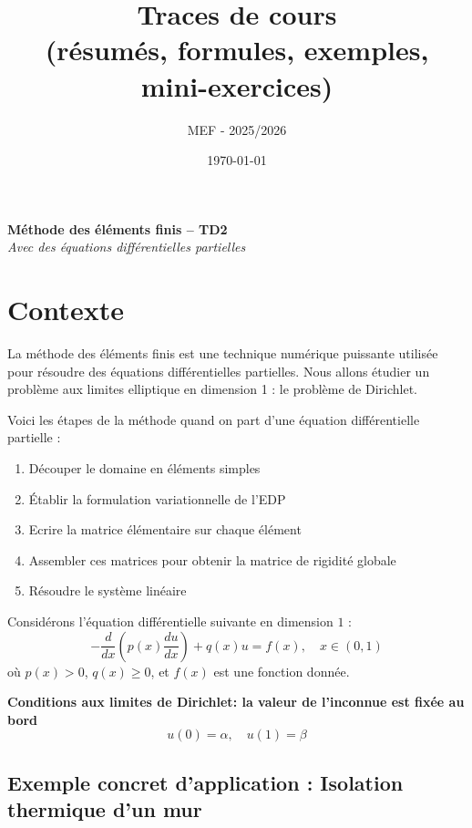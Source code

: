 \documentclass[11pt,a4paper]{report}
\title{\textbf{Traces de cours}\\\large (résumés, formules, exemples, mini-exercices)}
\author{ MEF - 2025/2026 }
\date{\today}
\begin{document}
\begin{center}
    {\LARGE \textbf{Méthode des éléments finis -- TD2}}\\[1em]
    {\large \textit{Avec des équations différentielles partielles}}
\end{center}
\section*{Contexte}
La méthode des éléments finis est une technique numérique puissante utilisée pour résoudre des équations différentielles partielles. Nous allons étudier un problème aux limites elliptique en dimension 1 : le problème de Dirichlet. 

Voici les étapes de la méthode quand on part d'une équation différentielle partielle :
\begin{enumerate}
    \item Découper le domaine en éléments simples
    \item Établir la formulation variationnelle de l'EDP
    \item Ecrire la matrice élémentaire sur chaque élément
    \item Assembler ces matrices pour obtenir la matrice de rigidité globale
    \item Résoudre le système linéaire
\end{enumerate}


Considérons l'équation différentielle suivante en dimension $1$ :
\[
- \frac{d}{dx} \left( p(x) \frac{du}{dx} \right) + q(x) u = f(x), \quad x \in (0, 1)
\]
où \( p(x) > 0 \), \( q(x) \geq 0 \), et \( f(x) \) est une fonction donnée.

\textbf{Conditions aux limites de Dirichlet: la valeur de l'inconnue est fixée au bord}
\[
u(0) = \alpha, \quad u(1) = \beta
\]

\subsection*{Exemple concret d'application : Isolation thermique d'un mur}
\end{document}
